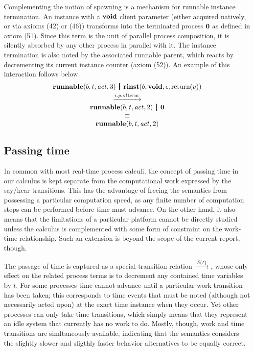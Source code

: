 \documentclass[twocolumn]{article}
\begin{document}
Complementing the notion of spawning is a mechanism for runnable instance termination. An instance with a $\textbf{void}$ client parameter (either acquired natively, or via axioms (42) or (46)) transforms into the terminated process $\textbf{0}$ as defined in axiom (51). Since this term is the unit of parallel process composition, it is silently absorbed by any other process in parallel with it. The instance termination is also noted by the associated runnable parent, which reacts by decrementing its current instance counter (axiom (52)). An example of this interaction follows below.
$$
\begin{array}{c}
	{\Trunnable b t \Act 3} \Opar
	{\Trinst b \Tvoid \Teps {\Treturn v}} \vspace{0.6ex} \\
	\red{\say{i.p.o}{\Tterm}} \\
	{\Trunnable b t \Act 2} \Opar \Tzero \\
	\equiv \\
	{\Trunnable b t \Act 2}
\end{array}
$$


\subsection{Passing time}

In common with most real-time process calculi, the concept of passing time in our calculus is kept separate from the computational work expressed by the say/hear transitions. This has the advantage of freeing the semantics from possessing a particular computation speed, as any finite number of computation steps can be performed before time must advance. On the other hand, it also means that the  limitations of a particular platform cannot be directly studied unless the calculus is complemented with some form of constraint on the work-time relationship. Such an extension is beyond the scope of the current report, though.

The passage of time is captured as a special transition relation $\,\xrightarrow{\delta(t)}\,$, whose only effect on the related process terms is to decrement any contained time variables by $t$. For some processes time cannot advance until a particular work transition has been taken; this corresponds to time events that must be noted (although not necessarily acted upon) at the exact time instance when they occur. Yet other processes can only take time transitions, which simply means that they represent an idle system that currently has no work to do. Mostly, though, work and time transitions are simltaneously available, indicating that the semantics considers the slightly slower and sligthly faster behavior alternatives to be equally correct.
\end{document}
